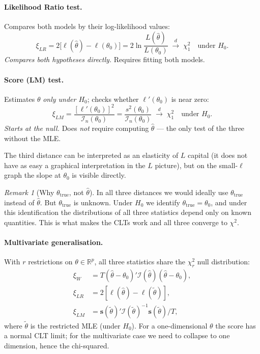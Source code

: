 \documentclass[a4paper,oneside,12pt]{extarticle}
\theoremstyle{plain}
\theoremstyle{definition}
\theoremstyle{remark}
\newtheorem{remark}[proposition]{Remark}
\begin{document}
\paragraph{Likelihood Ratio test.}
Compares both models by their log-likelihood values:
\[
  \xi_{LR} = 2\bigl[\ell(\hat\theta) - \ell(\theta_0)\bigr]
  = 2\ln\frac{L(\hat\theta)}{L(\theta_0)}
  \;\xrightarrow{d}\;\chi^2_1 \quad\text{under }H_0.
\]
\emph{Compares both hypotheses directly.}  Requires fitting both models.

\paragraph{Score (LM) test.}
Estimates $\theta$ \emph{only under $H_0$}; checks whether
$\ell'(\theta_0)$ is near zero:
\[
  \xi_{LM} = \frac{[\ell'(\theta_0)]^2}{\mathcal{I}_n(\theta_0)}
  = \frac{s^2(\theta_0)}{\mathcal{I}_n(\theta_0)}
  \;\xrightarrow{d}\;\chi^2_1 \quad\text{under }H_0.
\]
\emph{Starts at the null.}  Does \emph{not} require computing
$\hat\theta$ --- the only test of the three without the MLE.

The third distance can be interpreted as an elasticity of $L$
capital (it does not have as easy a graphical interpretation in the
$L$ picture), but on the small-$\ell$ graph the slope at
$\theta_0$ is visible directly.

\begin{remark}[Why $\theta_\mathrm{true}$, not $\hat\theta$]
In all three distances we would ideally use $\theta_\mathrm{true}$
instead of $\hat\theta$.  But $\theta_\mathrm{true}$ is unknown.
Under $H_0$ we identify $\theta_\mathrm{true}=\theta_0$, and under
this identification the distributions of all three statistics
depend only on known quantities.  This is what makes the CLTs work
and all three converge to $\chi^2$.
\end{remark}

\paragraph{Multivariate generalisation.}
With $r$ restrictions on $\theta\in\mathbb{R}^p$, all three
statistics share the $\chi^2_r$ null distribution:
\begin{align*}
  \xi_W    &= T(\hat\theta-\theta_0)'\mathcal{I}(\hat\theta)(\hat\theta-\theta_0),\\
  \xi_{LR} &= 2[\ell(\hat\theta)-\ell(\tilde\theta)],\\
  \xi_{LM} &= \mathbf{s}(\tilde\theta)'\mathcal{I}(\tilde\theta)^{-1}
              \mathbf{s}(\tilde\theta)/T,
\end{align*}
where $\tilde\theta$ is the restricted MLE (under $H_0$).
For a one-dimensional $\theta$ the score has a normal CLT limit; for
the multivariate case we need to collapse to one dimension, hence
the chi-squared.
\end{document}
